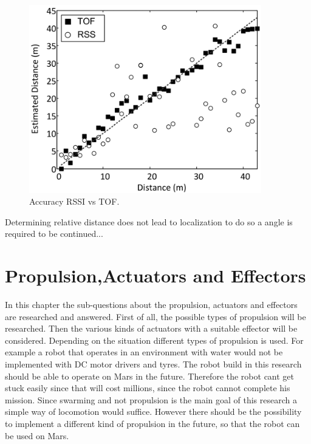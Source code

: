\documentclass[10pt,a4paper]{article}
\begin{document}
\begin{figure}[H]
\centering
\includegraphics[width=0.9\textwidth]{RSSIvsTOF.pdf}
\caption{Accuracy RSSI vs TOF.\cite{TOF}} 
\label{RSSIvsTOF}
\end{figure}

Determining relative distance does not lead to localization to do so a angle is required to be continued... 
\newpage



\section{Propulsion,Actuators and Effectors}

In this chapter the sub-questions about the propulsion, actuators and effectors are researched and answered. First of all, the possible types of propulsion will be researched. Then the various kinds of actuators with a suitable effector will be considered. Depending on the situation different types of propulsion is used. For example a robot that operates in an environment with water would not be implemented with DC motor drivers and tyres. The robot build in this research should be able to operate on Mars in the future. Therefore the robot cant get stuck easily since that will cost millions, since the robot cannot complete his mission. Since swarming and not propulsion is the main goal of this research a simple way of locomotion would suffice. However there should be the possibility to implement a different kind of propulsion in the future, so that the robot can be used on Mars. 
\end{document}
